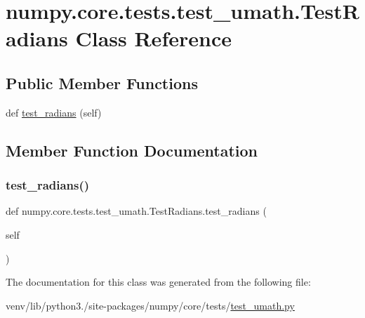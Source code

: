 \hypertarget{classnumpy_1_1core_1_1tests_1_1test__umath_1_1TestRadians}{}\section{numpy.\+core.\+tests.\+test\+\_\+umath.\+Test\+Radians Class Reference}
\label{classnumpy_1_1core_1_1tests_1_1test__umath_1_1TestRadians}
\subsection*{Public Member Functions}
\begin{DoxyCompactItemize}
\item 
def \hyperlink{classnumpy_1_1core_1_1tests_1_1test__umath_1_1TestRadians_ac15b91052e0e7c864bc7dd78d36089dc}{test\+\_\+radians} (self)
\end{DoxyCompactItemize}


\subsection{Member Function Documentation}
\mbox{\label{classnumpy_1_1core_1_1tests_1_1test__umath_1_1TestRadians_ac15b91052e0e7c864bc7dd78d36089dc}} 
\subsubsection{\texorpdfstring{test\+\_\+radians()}{test\_radians()}}
{\footnotesize\ttfamily def numpy.\+core.\+tests.\+test\+\_\+umath.\+Test\+Radians.\+test\+\_\+radians (\begin{DoxyParamCaption}\item[{}]{self }\end{DoxyParamCaption})}



The documentation for this class was generated from the following file\+:\begin{DoxyCompactItemize}
\item 
venv/lib/python3./site-\/packages/numpy/core/tests/\hyperlink{test__umath_8py}{test\+\_\+umath.\+py}\end{DoxyCompactItemize}
